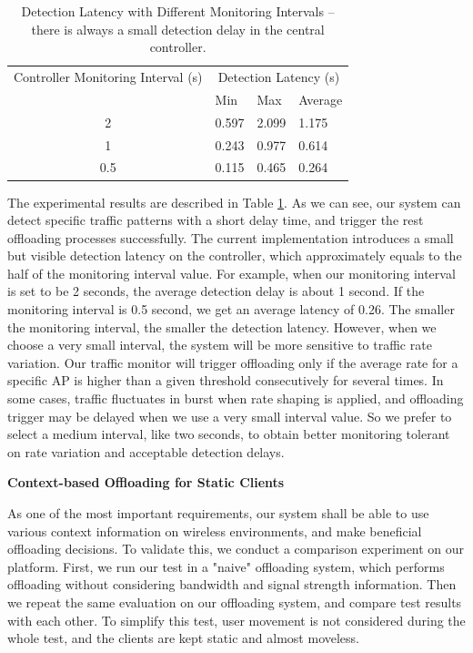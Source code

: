 \documentclass[english]{tktltiki}
\begin{document}
\begin{table}[htbp]
\centering
\begin{tabular}{|c|l|l|l|}
  \hline
  Controller Monitoring Interval (s) & \multicolumn{3}{c|}{Detection Latency (s)} \\
  \cline{2-4}
  & Min & Max & Average \\
  \hline
  2 & 0.597 & 2.099 & 1.175 \\
  \hline
  1 & 0.243 & 0.977 & 0.614 \\
  \hline
  0.5 & 0.115 & 0.465 & 0.264 \\
  \hline
\end{tabular}
\caption{Detection Latency with Different Monitoring Intervals -- there is always a small detection delay in the central controller.}
\label{tab:interval}
\end{table}

The experimental results are described in Table \ref{tab:interval}. As we can see, our system can detect specific traffic patterns with a short delay time, and trigger the rest offloading processes successfully. The current implementation introduces a small but visible detection latency on the controller, which approximately equals to the half of the monitoring interval value. For example, when our monitoring interval is set to be 2 seconds, the average detection delay is about 1 second. If the monitoring interval is 0.5 second, we get an average latency of 0.26. The smaller the monitoring interval, the smaller the detection latency. However, when we choose a very small interval, the system will be more sensitive to traffic rate variation. Our traffic monitor will trigger offloading only if the average rate for a specific AP is higher than a given threshold consecutively for several times. In some cases, traffic fluctuates in burst when rate shaping is applied, and offloading trigger may be delayed when we use a very small interval value. So we prefer to select a medium interval, like two seconds, to obtain better monitoring tolerant on rate variation and acceptable detection delays.


\vspace{1mm}

\textbf{Context-based Offloading for Static Clients}

\vspace{1mm}

As one of the most important requirements, our system shall be able to use various context information on wireless environments, and make beneficial offloading decisions. To validate this, we conduct a comparison experiment on our platform.  First, we run our test in a "naive" offloading system, which performs offloading without considering bandwidth and signal strength information. Then we repeat the same evaluation on our offloading system, and compare test results with each other. To simplify this test, user movement is not considered during the whole test, and the clients are kept static and almost moveless.
\end{document}
